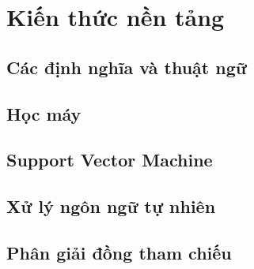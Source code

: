 \chapter{Kiến thức nền tảng}
\section{Các định nghĩa và thuật ngữ}
\section{Học máy}
\section{Support Vector Machine}
\section{Xử lý ngôn ngữ tự nhiên}
\section{Phân giải đồng tham chiếu}